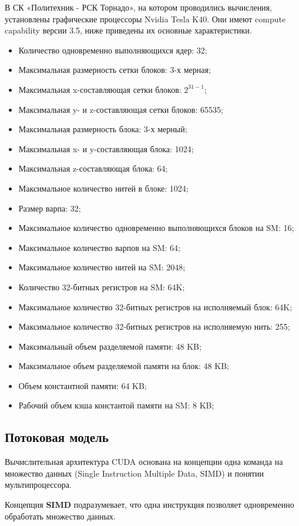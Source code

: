 \documentclass[a4paper, 12pt]{article}
\begin{document}
    В СК «Политехник - РСК Торнадо», на котором проводились вычисления, установлены графические процессоры Nvidia Tesla K40. Они имеют compute capability версии 3.5, ниже приведены их основные характеристики.
    \begin{itemize}
    \item Количество одновременно выполняющихся ядер: 32;
    \item Максимальная размерность сетки блоков: 3-х мерная;
    \item Максимальная x-составляющая сетки блоков: $2^{31 - 1}$;
    \item Максимальная y- и z-составляющая сетки блоков: 65535;
    \item Максимальная размерность блока: 3-х мерный;
    \item Максимальная x- и y-составляющая блока: 1024;
    \item Максимальная z-составляющая блока: 64;
    \item Максимальное количество нитей в блоке: 1024;
    \item Размер варпа: 32;
    \item Максимальное количество одновременно выполняющихся блоков на SM: 16;
    \item Максимальное количество варпов на SM: 64;
    \item Максимальное количество нитей на SM: 2048;
    \item Количество 32-битных регистров на SM: 64K;
    \item Максимальное количество 32-битных регистров на исполняемый блок: 64K;
    \item Максимальное количество 32-битных регистров на исполняемую нить: 255; 
    \item Максимальный объем разделяемой памяти: 48 KB;
    \item Максимальное объем разделяемой памяти на блок: 48 KB;
    \item Объем константной памяти: 64 KB;
    \item Рабочий объем кэша константой памяти на SM: 8 KB;
     \end{itemize}
    \subsection{Потоковая модель}
    Вычислительная архитектура CUDA основана на концепции одна команда на множество данных (Single Instruction Multiple Data, SIMD) и понятии мультипроцессора.
    
    Концепция \textbf{SIMD} подразумевает, что одна инструкция позволяет одновременно обработать множество данных. 
    
\end{document}
